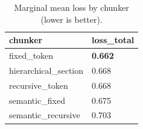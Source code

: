\begin{table}[t]
\centering
\small
\begin{tabular}{l l}
\toprule
chunker & loss_total \\
\midrule
fixed_token & \textbf{0.662} \\
hierarchical_section & 0.668 \\
recursive_token & 0.668 \\
semantic_fixed & 0.675 \\
semantic_recursive & 0.703 \\
\bottomrule
\end{tabular}
\caption{Marginal mean loss by chunker (lower is better).}
\label{tab:marginal_chunker}
\end{table}